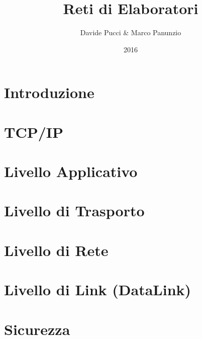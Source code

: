 

\title{Reti di Elaboratori}
\author{Davide Pucci \& Marco Panunzio}
\date{2016}



\maketitle

\tableofcontents

\chapter{Introduzione}


\chapter{TCP/IP}


\chapter{Livello Applicativo}


\chapter{Livello di Trasporto}


\chapter{Livello di Rete}


\chapter{Livello di Link (DataLink)}


\chapter{Sicurezza}


